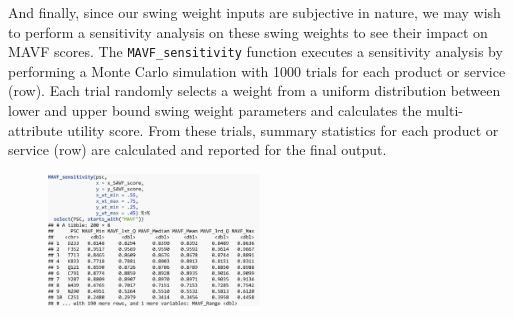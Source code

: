 \documentclass[twocolumn]{svjour3}       %
\begin{document}
And finally, since our swing weight inputs are subjective in nature, we may wish to perform a sensitivity analysis on these swing weights to see their impact on MAVF scores. The \texttt{MAVF\_sensitivity} function executes a sensitivity analysis by performing a Monte Carlo simulation with 1000 trials for each product or service (row). Each trial randomly selects a weight from a uniform distribution between lower and upper bound swing weight parameters and calculates the multi-attribute utility score. From these trials, summary statistics for each product or service (row) are calculated and reported for the final output. 
\begin{figure}[!htb]
  \includegraphics[width=0.5\textwidth]{code13.png}
\end{figure}
\end{document}
